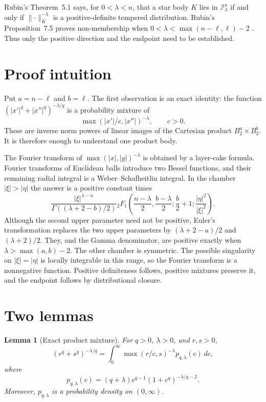 \documentclass[11pt]{article}
\newtheorem{lemma}{Lemma}
\theoremstyle{remark}
\newcommand{\Iclass}{\mathcal I}
\newcommand{\norm}[1]{\lVert #1\rVert}
\begin{document}
Rubin's Theorem~5.1 says, for $0<\lambda<n$, that a star body $K$ lies
in $\Iclass^n_\lambda$ if and only if $\norm{\cdot}_K^{-\lambda}$ is a
positive-definite tempered distribution.  Rubin's Proposition~7.5 proves
non-membership when
$0<\lambda<\max(n-\ell,\ell)-2$ \cite{Rubin}.  Thus only the positive
direction and the endpoint need to be established.

\section{Proof intuition}

Put $a=n-\ell$ and $b=\ell$.  The first observation is an exact identity:
the function $(|x'|^q+|x''|^q)^{-\lambda/q}$ is a probability mixture of
\[
\max(|x'|/c,|x''|)^{-\lambda},\qquad c>0.
\]
These are inverse norm powers of linear images of the Cartesian product
$B_2^a\times B_2^b$.  It is therefore enough to understand one product body.

The Fourier transform of $\max(|x|,|y|)^{-\lambda}$ is obtained by a
layer-cake formula.  Fourier transforms of Euclidean balls introduce two
Bessel functions, and their remaining radial integral is a
Weber--Schafheitlin integral.  In the chamber $|\xi|>|\eta|$ the answer is a
positive constant times
\[
\frac{|\xi|^{\lambda-n}}{\Gamma((\lambda+2-b)/2)}
{}_2F_1\left(\frac{n-\lambda}{2},\frac{b-\lambda}{2};
\frac b2+1;\frac{|\eta|^2}{|\xi|^2}\right).
\]
Although the second upper parameter need not be positive, Euler's
transformation replaces the two upper parameters by
$(\lambda+2-a)/2$ and $(\lambda+2)/2$.  They, and the Gamma denominator,
are positive exactly when $\lambda>\max(a,b)-2$.  The other chamber is
symmetric.  The possible singularity on $|\xi|=|\eta|$ is locally
integrable in this range, so the Fourier transform is a nonnegative
function.  Positive definiteness follows, positive mixtures preserve it,
and the endpoint follows by distributional closure.

\section{Two lemmas}

\begin{lemma}[Exact product mixture]\label{lem:mixture}
For $q>0$, $\lambda>0$, and $r,s>0$,
\begin{equation}\label{eq:mixture}
(r^q+s^q)^{-\lambda/q}
=\int_0^\infty \max(r/c,s)^{-\lambda}
p_{q,\lambda}(c)\,dc,
\end{equation}
where
\begin{equation}\label{eq:density}
p_{q,\lambda}(c)=(q+\lambda)c^{q-1}
(1+c^q)^{-\lambda/q-2}.
\end{equation}
Moreover, $p_{q,\lambda}$ is a probability density on $(0,\infty)$.
\end{lemma}
\end{document}
